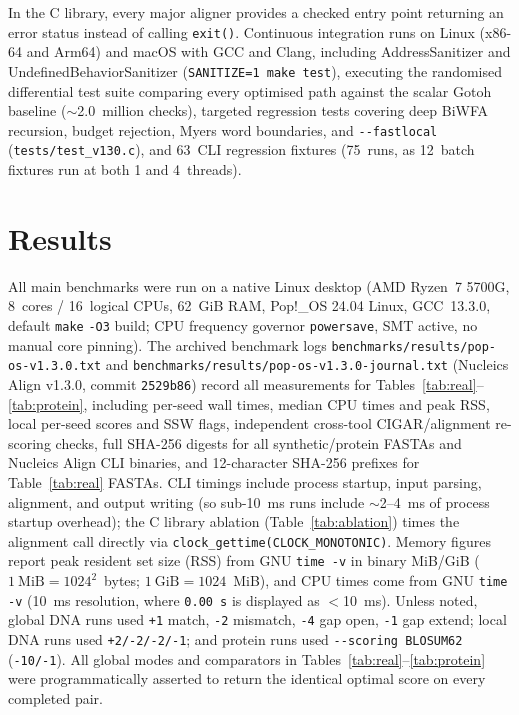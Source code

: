 \documentclass[11pt,a4paper]{article}
\begin{document}
In the C library, every major aligner provides a checked entry point returning an error status instead of calling \texttt{exit()}. Continuous integration runs on Linux (x86-64 and Arm64) and macOS with GCC and Clang, including AddressSanitizer and UndefinedBehaviorSanitizer (\texttt{SANITIZE=1 make test}), executing the randomised differential test suite comparing every optimised path against the scalar Gotoh baseline ($\sim$2.0~million checks), targeted regression tests covering deep BiWFA recursion, budget rejection, Myers word boundaries, and \texttt{-{}-fastlocal} (\texttt{tests/test\_v130.c}), and 63~CLI regression fixtures (75~runs, as 12~batch fixtures run at both 1 and 4~threads).

\section{Results}

All main benchmarks were run on a native Linux desktop (AMD Ryzen~7 5700G, 8~cores / 16~logical CPUs, 62~GiB RAM, Pop!\_OS 24.04 Linux, GCC~13.3.0, default \texttt{make} \texttt{-O3} build; CPU frequency governor \texttt{powersave}, SMT active, no manual core pinning). The archived benchmark logs \texttt{benchmarks/results/pop-os-v1.3.0.txt} and \texttt{benchmarks/results/pop-os-v1.3.0-journal.txt} (Nucleics Align v1.3.0, commit \texttt{2529b86}) record all measurements for Tables~\ref{tab:real}--\ref{tab:protein}, including per-seed wall times, median CPU times and peak RSS, local per-seed scores and SSW flags, independent cross-tool CIGAR/alignment re-scoring checks, full SHA-256 digests for all synthetic/protein FASTAs and Nucleics Align CLI binaries, and 12-character SHA-256 prefixes for Table~\ref{tab:real} FASTAs. CLI timings include process startup, input parsing, alignment, and output writing (so sub-10~ms runs include $\sim$2--4~ms of process startup overhead); the C library ablation (Table~\ref{tab:ablation}) times the alignment call directly via \texttt{clock\_gettime(CLOCK\_MONOTONIC)}. Memory figures report peak resident set size (RSS) from GNU \texttt{time -v} in binary MiB/GiB ($1~\text{MiB} = 1024^2$~bytes; $1~\text{GiB} = 1024$~MiB), and CPU times come from GNU \texttt{time -v} (10~ms resolution, where \texttt{0.00~s} is displayed as $<$10~ms). Unless noted, global DNA runs used \texttt{+1} match, \texttt{-2} mismatch, \texttt{-4} gap open, \texttt{-1} gap extend; local DNA runs used \texttt{+2/-2/-2/-1}; and protein runs used \texttt{-{}-scoring BLOSUM62} (\texttt{-10/-1}). All global modes and comparators in Tables~\ref{tab:real}--\ref{tab:protein} were programmatically asserted to return the identical optimal score on every completed pair.
\end{document}
